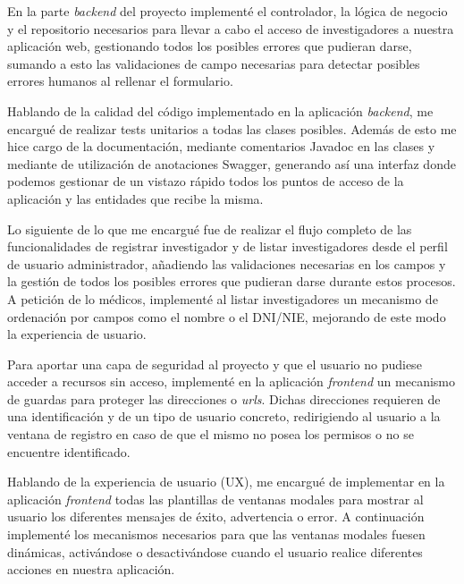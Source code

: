 En la parte \textit{backend} del proyecto implementé el controlador, la lógica de negocio y el repositorio necesarios para llevar a cabo el acceso de investigadores a nuestra aplicación web, gestionando todos los posibles errores que pudieran darse, sumando a esto las validaciones de campo necesarias para detectar posibles errores humanos al rellenar el formulario. \newline

Hablando de la calidad del código implementado en la aplicación \textit{backend}, me encargué de realizar tests unitarios a todas las clases posibles. Además de esto me hice cargo de la documentación, mediante comentarios Javadoc en las clases y mediante de utilización de anotaciones Swagger, generando así una interfaz donde podemos gestionar de un vistazo rápido todos los puntos de acceso de la aplicación y las entidades que recibe la misma. \newline

Lo siguiente de lo que me encargué fue de realizar el flujo completo de las funcionalidades de registrar investigador y de listar investigadores desde el perfil de usuario administrador, añadiendo las validaciones necesarias en los campos y la gestión de todos los posibles errores que pudieran darse durante estos procesos. A petición de lo médicos, implementé al listar investigadores un mecanismo de ordenación por campos como el nombre o el DNI/NIE, mejorando de este modo la experiencia de usuario. \newline

Para aportar una capa de seguridad al proyecto y que el usuario no pudiese acceder a recursos sin acceso, implementé en la aplicación \textit{frontend} un mecanismo de guardas para proteger las direcciones o \textit{urls}. Dichas direcciones requieren de una identificación y de un tipo de usuario concreto, redirigiendo al usuario a la ventana de registro en caso de que el mismo no posea los permisos o no se encuentre identificado. \newline

Hablando de la experiencia de usuario (UX), me encargué de implementar en la aplicación \textit{frontend} todas las  plantillas de ventanas modales para mostrar al usuario los diferentes mensajes de éxito, advertencia o error. A continuación implementé los mecanismos necesarios para que las ventanas modales fuesen dinámicas, activándose o desactivándose cuando el usuario realice diferentes acciones en nuestra aplicación. \newline

